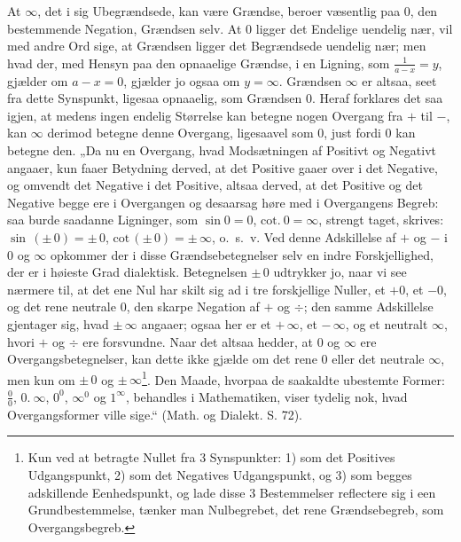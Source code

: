 \documentclass[12pt,a4paper]{book}
\begin{document}
At $\infty$, det i sig Ubegrændsede, kan være Grændse, beroer
væsentlig paa $0$, den bestemmende Negation, Grændsen selv. At $0$
ligger det Endelige uendelig nær, vil med andre Ord sige, at Grændsen
ligger det Begrændsede uendelig nær; men hvad der, med Hensyn paa den
opnaaelige Grændse, i en Ligning, som $\frac{1}{a-x} = y$, gjælder om
$a - x = 0$, gjælder jo ogsaa om $y = \infty$. Grændsen $\infty$ er
altsaa, seet fra dette Synspunkt, ligesaa opnaaelig, som Grændsen $0$.
Heraf
\setcounter{footnote}{0}
forklares det saa igjen, at medens ingen endelig Størrelse kan betegne
nogen Overgang fra $+$ til $-$, kan $\infty$ derimod betegne denne
Overgang, ligesaavel som $0$, just fordi $0$ kan betegne den. „Da nu en
Overgang, hvad Modsætningen af Positivt og Negativt angaaer, kun faaer
Betydning derved, at det Positive gaaer over i det Negative, og
omvendt det Negative i det Positive, altsaa derved, at det Positive og
det Negative begge ere i Overgangen og desaarsag høre med i
Overgangens Begreb: saa burde saadanne Ligninger, som $\sin 0 = 0$,
$\mathrm{cot.}\ 0 = \infty$, strengt taget, skrives: $\sin\,(\pm\,0) =
\pm\,0$, $\mathrm{cot}\,(\pm\,0) = \pm\,\infty$, o.~s.~v. Ved denne
Adskillelse af $+$ og $-$ i $0$ og $\infty$ opkommer der i disse
Grændsebetegnelser selv en indre Forskjellighed, der er i høieste Grad
dialektisk. Betegnelsen $\pm\,0$ udtrykker jo, naar vi see nærmere til,
at det ene Nul har skilt sig ad i tre forskjellige Nuller, et $+0$, et
$-0$, og det rene neutrale $0$, den skarpe Negation af $+$ og $\div$;
den samme Adskillelse gjentager sig, hvad $\pm\,\infty$ angaaer; ogsaa
her er et $+\,\infty$, et $-\,\infty$, og et neutralt $\infty$, hvori
$+$ og $\div$ ere forsvundne. Naar det altsaa hedder, at $0$ og
$\infty$ ere Overgangsbetegnelser, kan dette ikke gjælde om det rene
$0$ eller det neutrale $\infty$, men kun om $\pm\,0$ og
$\pm\,\infty$\footnote{Kun ved at betragte Nullet fra 3 Synspunkter:
1) som det Positives Udgangspunkt, 2) som det Negatives Udgangspunkt,
og 3) som begges adskillende Eenhedspunkt, og lade disse 3
Bestemmelser reflectere sig i een Grundbestemmelse, tænker man
Nulbegrebet, det rene Grændsebegreb, som Overgangsbegreb.}. Den Maade,
hvorpaa de saakaldte ubestemte Former: $\frac{0}{0}$, $0.\ \infty$,
$0^{0}$, $\infty^{0}$ og $1^{\infty}$, behandles i Mathematiken, viser
tydelig nok, hvad Overgangsformer ville sige.“ (Math. og Dialekt.
S. 72).
\end{document}
